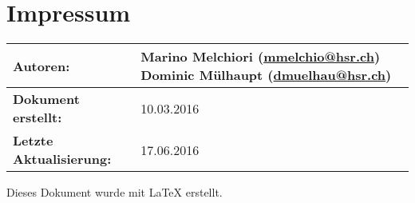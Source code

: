 \chapter*{Impressum}

\begin{table}[H] 
\centering 
\begin{tabular}{|p{0.35\twocelltabwidth}|p{0.65\twocelltabwidth}|}
\hline 
\textbf{Autoren:} & Marino Melchiori (\url{mmelchio@hsr.ch}) \newline
Dominic Mülhaupt (\url{dmuelhau@hsr.ch}) \\ 
\hline 
\textbf{Dokument erstellt:} & 10.03.2016 \\ 
\hline 
\textbf{Letzte Aktualisierung:} & 17.06.2016 \\ 
\hline 
\end{tabular}
\end{table}

Dieses Dokument wurde mit \LaTeX{} erstellt.